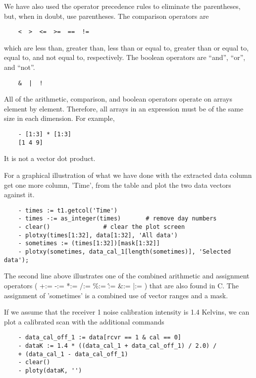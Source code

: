 We have also used the operator precedence rules to eliminate the
parentheses, but, when in doubt, use parentheses. The comparison operators
are

\begin{verbatim}
	<  >  <=  >=  ==  !=
\end{verbatim}

which are less than, greater than, less than or equal to, greater than or
equal to, equal to, and not equal to, respectively.  The boolean operators
are ``and'', ``or'', and ``not''.

\begin{verbatim}
	&  |  !
\end{verbatim}

All of the arithmetic, comparison, and boolean operators operate on arrays
element by element.  Therefore, all arrays in an expression must be of the
same size in each dimension.  For example,

\begin{verbatim}
	- [1:3] * [1:3]
	[1 4 9]
\end{verbatim}

It is not a vector dot product.

    For a graphical illustration of what we have done with the extracted
data column get one more column, 'Time', from the table and plot the two
data vectors against it.

\begin{verbatim}
	- times := t1.getcol('Time')
	- times -:= as_integer(times)		# remove day numbers
	- clear()				# clear the plot screen
	- plotxy(times[1:32], data[1:32], 'All data')
	- sometimes := (times[1:32])[mask[1:32]]
	- plotxy(sometimes, data_cal_1[length(sometimes)], 'Selected data');
\end{verbatim}

The second line above illustrates one of the combined arithmetic and
assignment operators ( +:= -:= *:= /:= \%:= \^:= \&:= |:= ) that are also
found in C.  The assignment of 'sometimes' is a combined use of vector
ranges and a mask.

    If we assume that the receiver 1 noise calibration intensity is 1.4
Kelvins, we can plot a calibrated scan with the additional commands

\begin{verbatim}
	- data_cal_off_1 := data[rcvr == 1 & cal == 0]
	- dataK := 1.4 * ((data_cal_1 + data_cal_off_1) / 2.0) /
	+ (data_cal_1 - data_cal_off_1)
	- clear()
	- ploty(dataK, '')
\end{verbatim}

